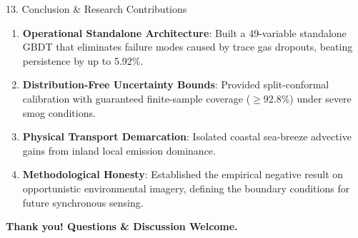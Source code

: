 \documentclass[aspectratio=169]{beamer}
\begin{document}
\begin{frame}{13. Conclusion \& Research Contributions}
  \begin{enumerate}
    \item \textbf{Operational Standalone Architecture}: Built a 49-variable standalone GBDT that eliminates failure modes caused by trace gas dropouts, beating persistence by up to 5.92\%.
    \item \textbf{Distribution-Free Uncertainty Bounds}: Provided split-conformal calibration with guaranteed finite-sample coverage ($\ge 92.8\%$) under severe smog conditions.
    \item \textbf{Physical Transport Demarcation}: Isolated coastal sea-breeze advective gains from inland local emission dominance.
    \item \textbf{Methodological Honesty}: Established the empirical negative result on opportunistic environmental imagery, defining the boundary conditions for future synchronous sensing.
  \end{enumerate}
  \begin{center}
    \textbf{Thank you! Questions \& Discussion Welcome.}
  \end{center}
\end{frame}
\end{document}
